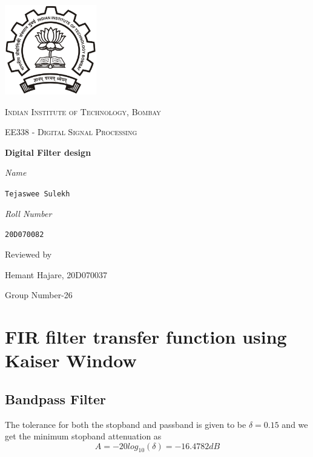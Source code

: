\documentclass{scrartcl}
\begin{document}
\begin{titlepage}
	\centering
	\includegraphics[width=0.3\textwidth]{LOGO.PNG}\par\vspace{1cm} %
	{\scshape\LARGE Indian Institute of Technology, Bombay \par} %
	\vspace{1cm}
	{\scshape\Large EE338 - Digital Signal Processing \par} %
	\vspace{1.5cm}
	{\huge\bfseries Digital Filter design\par} %
	\vspace{2cm}
	{\Large\itshape Name}\par %
	\texttt{Tejaswee Sulekh}\par %
	\vspace{0.7cm}
	{\Large\itshape Roll Number}\par %
	\texttt{20D070082}\par %
	\vfill
	Reviewed by\par %
	   Hemant Hajare, 20D070037 %
	\vfill

	{\large Group Number-26\par}
\end{titlepage}


\section{FIR filter transfer function using Kaiser Window}

\subsection{Bandpass Filter}
The tolerance for both the stopband and passband is given to be $\delta = 0.15$ and we get the minimum stopband attenuation as
\begin{equation}
    A = - 20log_{10}(\delta) = -16.4782 dB
\end{equation}
\end{document}

